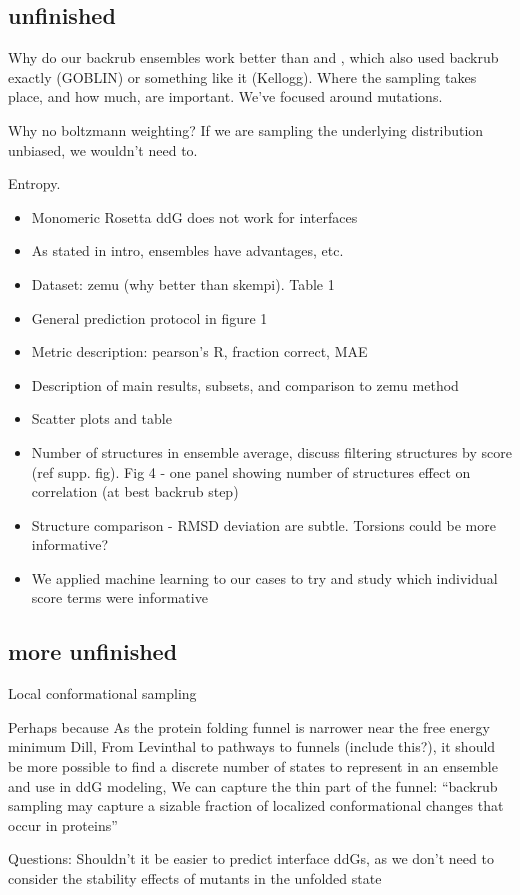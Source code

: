 \subsection{unfinished}

Why do our backrub ensembles work better than \cite{kamisetty_accounting_2011} and \cite{kellogg_role_2011}, which also used backrub exactly (GOBLIN) or something like it (Kellogg). Where the sampling takes place, and how much, are important. We've focused around mutations.

Why no boltzmann weighting? If we are sampling the underlying distribution unbiased, we wouldn't need to.

Entropy.

\begin{itemize}
\item Monomeric Rosetta ddG does not work for interfaces
\item As stated in intro, ensembles have advantages, etc.
\item Dataset: zemu (why better than skempi). Table 1
\item General prediction protocol in figure 1
\item Metric description: pearson’s R, fraction correct, MAE
\item Description of main results, subsets, and comparison to zemu method
\item Scatter plots and table
\item Number of structures in ensemble average, discuss filtering structures by score (ref supp. fig). Fig 4 - one panel showing number of structures effect on correlation (at best backrub step)
\item Structure comparison - RMSD deviation are subtle. Torsions could be more informative?
\item We applied machine learning to our cases to try and study which individual score terms were informative
\end{itemize}

\subsection{more unfinished}
Local conformational sampling

Perhaps because
As the protein folding funnel is narrower near the free energy minimum {Dill, From Levinthal to pathways to funnels (include this?)}, it should be more possible to find a discrete number of states to represent in an ensemble and use in ddG modeling,
We can capture the thin part of the funnel:
“backrub sampling may capture a sizable fraction of localized conformational changes that occur in proteins” \cite{humphris_prediction_2008}

Questions:
Shouldn’t it be easier to predict interface ddGs, as we don’t need to consider the stability effects of mutants in the unfolded state
